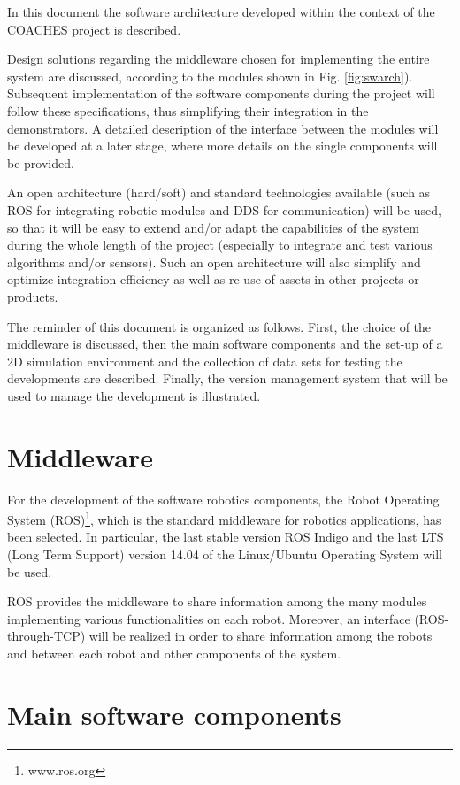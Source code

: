 \documentclass{article}
\begin{document}
In this document the software architecture developed within the
context of the COACHES project is described.

Design solutions regarding the middleware chosen for implementing the entire system are discussed,
according to the modules shown in Fig. \ref{fig:swarch}).
Subsequent implementation of the software components during the project will follow  these  specifications,  thus  simplifying  their  integration  in  the demonstrators. 
A detailed description of the interface between the modules will be developed at a later stage, where more details on the single components will be provided.


An open architecture (hard/soft) and standard technologies available (such 
as ROS for integrating robotic modules and DDS for communication) will be used,
so that it will be 
easy to extend and/or adapt the capabilities of the system during the whole length of 
the  project  (especially  to  integrate  and  test  various  algorithms  and/or  sensors).  Such 
an open architecture will also simplify and optimize integration efficiency as well as re-use of assets in other projects or products. 

The reminder of this document is organized as follows.
First, the choice of the middleware is discussed, then the main software components and the
set-up of a 2D simulation environment and the collection of data sets for testing the developments are described.
Finally, the version management system that will be used to manage the development is illustrated.

\section{Middleware}

For the development of the software robotics components, the Robot Operating System (ROS)\footnote{www.ros.org}, which is the standard middleware for robotics applications, has been selected.
In particular, the last stable version ROS Indigo and the last LTS (Long Term Support) version 14.04 of the Linux/Ubuntu Operating System will be used.

ROS provides the middleware to share information among the many modules implementing various functionalities on each robot. Moreover, an interface (ROS-through-TCP) will be realized in order to share information among the robots and between each robot and other components of the system.

\section{Main software components}
\end{document}
